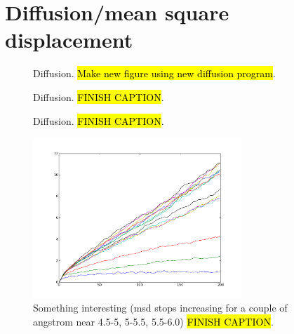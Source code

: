 \FloatBarrier
\section{Diffusion/mean square displacement}
\begin{figure}[htpb]%
    \centering%
    {
        \newcommand{\f}{\footnotesize}
    }
    \caption{%
        Diffusion. \hl{Make new figure using new diffusion program}. %
    }%
\end{figure}%


\begin{figure}[htpb]%
    \centering%
    \caption{%
        Diffusion. \hl{FINISH CAPTION}. %
    }%
\end{figure}%

\begin{figure}[htpb]%
    \centering%
    \caption{%
        Diffusion. \hl{FINISH CAPTION}. %
    }%
\end{figure}%

\begin{figure}[htpb]%
    \centering%
    \includegraphics[width=0.7\textwidth]{images/diffusion/mean_square_displacement_interesting.png}%
    \caption{%
        Something interesting (msd stops increasing for a couple of angstrom near 4.5-5, 5-5.5, 5.5-6.0) \hl{FINISH CAPTION}. %
    }%
\end{figure}%

